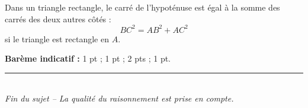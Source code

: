 \documentclass[11pt,a4paper]{article}
\begin{document}
\begin{tcolorbox}[title=Rappel utile]
Dans un triangle rectangle, le carré de l'hypoténuse est égal à la somme des carrés des deux autres côtés :
\[
BC^2 = AB^2 + AC^2
\]
si le triangle est rectangle en \(A\).
\end{tcolorbox}

\textbf{Barème indicatif :} 1 pt ; 1 pt ; 2 pts ; 1 pt.

\vfill

\begin{center}
\rule{0.8\textwidth}{0.6pt}\\[0.4em]
\textit{Fin du sujet -- La qualité du raisonnement est prise en compte.}
\end{center}
\end{document}
